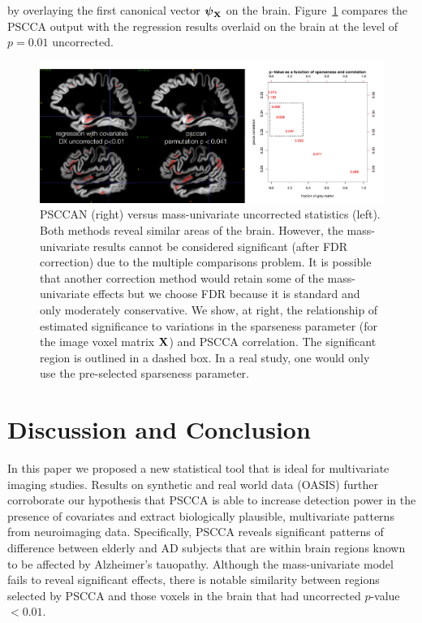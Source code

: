 \documentclass{llncs}
\newcommand{\X}{{\bf X}}
\newcommand{\Y}{{\bf Y}}
\newcommand{\bs}{\boldsymbol}
\begin{document}
by overlaying the first canonical vector $\bs \psi_{\X}$ on the brain.
Figure~\ref{fig:comp} compares the PSCCA output with the regression
results overlaid on the brain at the level of $p=0.01$ uncorrected.
\begin{figure}
\label{fig:comp}
\begin{center}
\includegraphics[width=120mm]{MUvPSCCAN.pdf} 
\end{center}
\caption{PSCCAN (right) versus mass-univariate uncorrected statistics
(left).  Both methods reveal similar areas of the brain.  However, the
mass-univariate results cannot be considered significant (after FDR
correction) due to the multiple comparisons problem.  It is possible
that another correction method would retain some of the mass-univariate
effects but we choose FDR because it is standard and only moderately
conservative.  We show, at right, the relationship of estimated
significance to variations in the sparseness parameter (for the image
voxel matrix $\X$) and PSCCA correlation.  The significant region is
outlined in a dashed box.  In a real study, one would only use the
pre-selected sparseness parameter.}
\end{figure}
\vspace{-0.1in}


\section{Discussion and Conclusion}
In this paper we proposed a new statistical tool that is
ideal for multivariate imaging studies. 
Results on synthetic and
real world data (OASIS) further corroborate our hypothesis that PSCCA
is able to increase detection power in the presence of covariates and
extract biologically plausible, multivariate patterns from neuroimaging
data.  Specifically, PSCCA reveals significant patterns of difference
between elderly and AD subjects that are within brain regions known to
be affected by Alzheimer's tauopathy.  Although the mass-univariate model fails to reveal
significant effects, there is notable similarity between regions selected by PSCCA and
those voxels in the brain that had uncorrected $p$-value $< 0.01$.   
\end{document}
